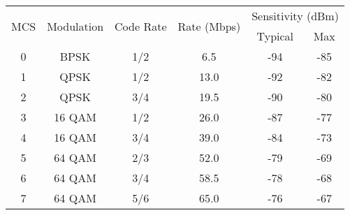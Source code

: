 \begin{table}[!htp]
\renewcommand{\arraystretch}{1}
\centering
\begin{threeparttable}[b]
\begin{tabular}{cccccc}
\hline
  \multirow{2}{*}{MCS} & \multirow{2}{*}{Modulation} & \multirow{2}{*}{Code Rate} & \multirow{2}{*}{Rate (Mbps)} & \multicolumn{2}{c}{Sensitivity (dBm)} \\
\cline{5-6}
  & & & & Typical & Max \\
\hline
  0 & BPSK & 1/2 & 6.5 & -94 & -85 \\
  1 & QPSK & 1/2 & 13.0 & -92 & -82 \\
  2 & QPSK & 3/4 & 19.5 & -90 & -80 \\
  3 & 16 QAM & 1/2 & 26.0 & -87 & -77 \\
  4 & 16 QAM & 3/4 & 39.0 & -84 & -73 \\
  5 & 64 QAM & 2/3 & 52.0 & -79 & -69 \\
  6 & 64 QAM & 3/4 & 58.5 & -78 & -68 \\
  7 & 64 QAM & 5/6 & 65.0 & -76 & -67 \\
\hline
\end{tabular}
\end{threeparttable}
\end{table}

